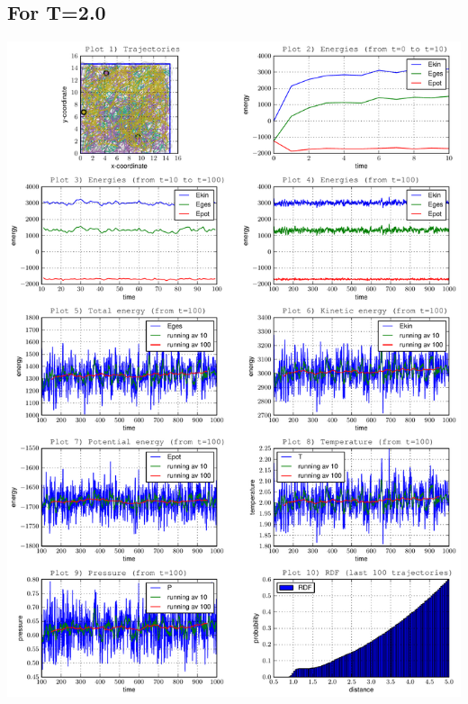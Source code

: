 \documentclass[12pt,a4paper]{scrartcl}
\begin{document}
\subsection*{For T=2.0}
\includegraphics[page=1, scale=0.6]{../plots/all20}
\end{document}

